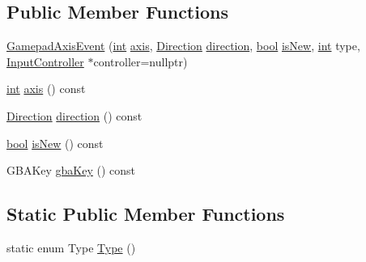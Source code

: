 \subsection*{Public Member Functions}
\begin{DoxyCompactItemize}
\item 
\mbox{\hyperlink{class_q_g_b_a_1_1_gamepad_axis_event_a920eb7ca809dc7423c165aaa476f5061}{Gamepad\+Axis\+Event}} (\mbox{\hyperlink{ioapi_8h_a787fa3cf048117ba7123753c1e74fcd6}{int}} \mbox{\hyperlink{class_q_g_b_a_1_1_gamepad_axis_event_a9f6eb219e344d8added3dbc3867a84fb}{axis}}, \mbox{\hyperlink{class_q_g_b_a_1_1_gamepad_axis_event_a5d50ab74dce4e58252f2affb5f227bbc}{Direction}} \mbox{\hyperlink{class_q_g_b_a_1_1_gamepad_axis_event_aa4348e9085dd4cd22d9b0f84a033a3d5}{direction}}, \mbox{\hyperlink{libretro_8h_a4a26dcae73fb7e1528214a068aca317e}{bool}} \mbox{\hyperlink{class_q_g_b_a_1_1_gamepad_axis_event_ab9500aceac79b152a5e6a3ee90922f6b}{is\+New}}, \mbox{\hyperlink{ioapi_8h_a787fa3cf048117ba7123753c1e74fcd6}{int}} type, \mbox{\hyperlink{class_q_g_b_a_1_1_input_controller}{Input\+Controller}} $\ast$controller=nullptr)
\item 
\mbox{\hyperlink{ioapi_8h_a787fa3cf048117ba7123753c1e74fcd6}{int}} \mbox{\hyperlink{class_q_g_b_a_1_1_gamepad_axis_event_a9f6eb219e344d8added3dbc3867a84fb}{axis}} () const
\item 
\mbox{\hyperlink{class_q_g_b_a_1_1_gamepad_axis_event_a5d50ab74dce4e58252f2affb5f227bbc}{Direction}} \mbox{\hyperlink{class_q_g_b_a_1_1_gamepad_axis_event_aa4348e9085dd4cd22d9b0f84a033a3d5}{direction}} () const
\item 
\mbox{\hyperlink{libretro_8h_a4a26dcae73fb7e1528214a068aca317e}{bool}} \mbox{\hyperlink{class_q_g_b_a_1_1_gamepad_axis_event_ab9500aceac79b152a5e6a3ee90922f6b}{is\+New}} () const
\item 
G\+B\+A\+Key \mbox{\hyperlink{class_q_g_b_a_1_1_gamepad_axis_event_abb9d09a8363acca86365a00d0b54037d}{gba\+Key}} () const
\end{DoxyCompactItemize}
\subsection*{Static Public Member Functions}
\begin{DoxyCompactItemize}
\item 
static enum Type \mbox{\hyperlink{class_q_g_b_a_1_1_gamepad_axis_event_acd745058d3f98c37837432bf01067c16}{Type}} ()
\end{DoxyCompactItemize}
